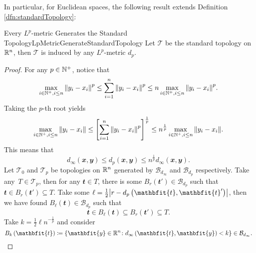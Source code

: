 \documentclass[math, code]{amznotes}
\theoremstyle{remark}
\begin{document}
In particular, for Euclidean spaces, the following result extends Definition \ref{dfn:standardTopology}:
\begin{probox}{Every $L^p$-metric Generates the Standard Topology}{LpMetricGenerateStandardTopology}
    Let $\mathcal{T}$ be the standard topology on $\mathbb{R}^n$, then $\mathcal{T}$ is induced by any $L^p$-metric $d_p$.
    \tcblower
    \begin{proof}
        For any $p \in \mathbb{N}^+$, notice that 
        \begin{equation*}
            \max_{i \in \mathbb{N}^+, i \leq n}{\left\lVert {y_i - x_i} \right\rVert}^p \leq \sum_{i = 1}^{n}{\left\lVert {y_i - x_i} \right\rVert}^p \leq n\max_{i \in \mathbb{N}^+, i \leq n}{\left\lVert {y_i - x_i} \right\rVert}^p.
        \end{equation*}
        Taking the $p$-th root yields
        \begin{equation*}
            \max_{i \in \mathbb{N}^+, i \leq n}{\left\lVert {y_i - x_i} \right\rVert} \leq \left[\sum_{i = 1}^{n}{\left\lVert {y_i - x_i} \right\rVert}^p\right]^{\frac{1}{p}} \leq n^{\frac{1}{p}}\max_{i \in \mathbb{N}^+, i \leq n}{\left\lVert {y_i - x_i} \right\rVert}.
        \end{equation*}
        This means that 
        \begin{equation*}
            d_{\infty}\left(\mathbfit{x}, \mathbfit{y}\right) \leq d_p\left(\mathbfit{x}, \mathbfit{y}\right) \leq n^{\frac{1}{p}}d_{\infty}\left(\mathbfit{x}, \mathbfit{y}\right).
        \end{equation*}
        Let $\mathcal{T}_0$ and $\mathcal{T}_p$ be topologies on $\mathbb{R}^n$ generated by $\mathcal{B}_{d_{\infty}}$ and $\mathcal{B}_{d_p}$ respectively. Take any~$T \in \mathcal{T}_p$, then for any $\mathbfit{t} \in T$, there is some $B_{r}\left(\mathbfit{t}'\right) \in \mathcal{B}_{d_{p}}$ such that~$\mathbfit{t} \in B_{r}\left(\mathbfit{t}'\right) \subseteq T$. Take some $\ell = \frac{1}{2}\abs{r - d_p\left(\mathbfit{t}, \mathbfit{t}'\right)}$, then we have found $B_{\ell}\left(\mathbfit{t}\right) \in \mathcal{B}_{d_p}$ such that 
        \begin{equation*}
            \mathbfit{t} \in B_{\ell}\left(\mathbfit{t}\right) \subseteq B_{r}\left(\mathbfit{t}'\right) \subseteq T.
        \end{equation*}
        Take $k = \frac{1}{2}\ell n^{-\frac{1}{p}}$ and consider 
        \begin{equation*}
            B_{k}\left(\mathbfit{t}\right) \coloneqq \left\{\mathbfit{y} \in \R^n \colon d_{\infty}\left(\mathbfit{t}, \mathbfit{y}\right) < k\right\} \in \mathcal{B}_{d_{\infty}}.
        \end{equation*}

\end{proof}
\end{probox}
\end{document}
